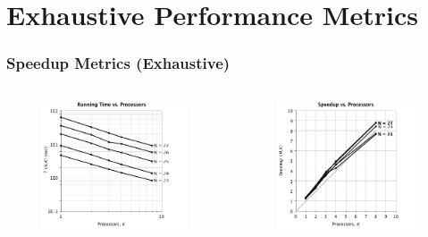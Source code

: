 \documentclass[handout,10pt]{beamer}
\begin{document}
\section{Exhaustive Performance Metrics}
\begin{frame}
	\frametitle{Speedup Metrics (Exhaustive)}

\begin{columns}
	\vspace{-1em}
	\begin{figure}
	\centering
	\includegraphics[scale = 0.25]{e_speed_4.png}
	\end{figure}
	\vspace{-2em}
	\begin{figure}
	\centering
	\includegraphics[scale = 0.25]{e_speed_3.png}

\end{figure}
\end{columns}
\end{frame}
\end{document}
